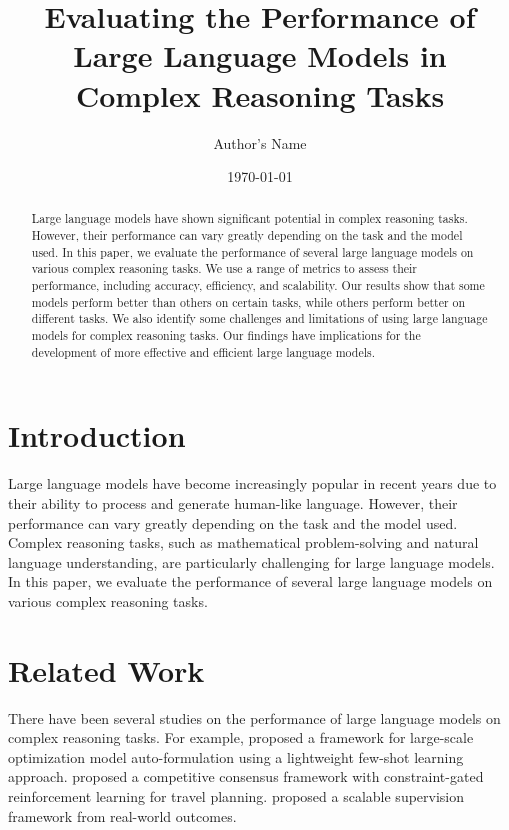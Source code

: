 \documentclass{article}
\begin{document}
\title{Evaluating the Performance of Large Language Models in Complex Reasoning Tasks}
\author{Author's Name}
\date{\today}

\maketitle

\begin{abstract}
Large language models have shown significant potential in complex reasoning tasks. However, their performance can vary greatly depending on the task and the model used. In this paper, we evaluate the performance of several large language models on various complex reasoning tasks. We use a range of metrics to assess their performance, including accuracy, efficiency, and scalability. Our results show that some models perform better than others on certain tasks, while others perform better on different tasks. We also identify some challenges and limitations of using large language models for complex reasoning tasks. Our findings have implications for the development of more effective and efficient large language models.
\end{abstract}

\section{Introduction}
Large language models have become increasingly popular in recent years due to their ability to process and generate human-like language. However, their performance can vary greatly depending on the task and the model used. Complex reasoning tasks, such as mathematical problem-solving and natural language understanding, are particularly challenging for large language models. In this paper, we evaluate the performance of several large language models on various complex reasoning tasks.

\section{Related Work}
There have been several studies on the performance of large language models on complex reasoning tasks. For example, \citet{liang2026llmlargescaleoptimizationmodel} proposed a framework for large-scale optimization model auto-formulation using a lightweight few-shot learning approach. \citet{wang2026tourplannercompetitiveconsensusframework} proposed a competitive consensus framework with constraint-gated reinforcement learning for travel planning. \citet{turtel2026futureaslabelscalablesupervisionrealworld} proposed a scalable supervision framework from real-world outcomes.
\end{document}
